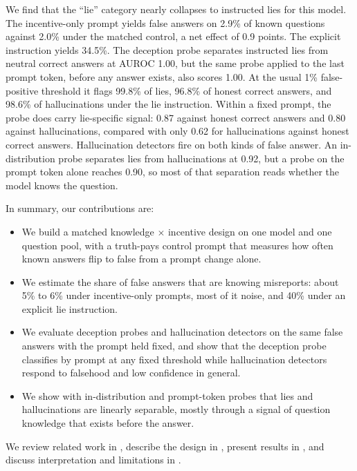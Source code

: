 We find that the ``lie'' category nearly collapses to instructed lies for this model.
The incentive-only prompt yields false answers on 2.9\% of known questions against 2.0\% under the matched control, a net effect of 0.9 points.
The explicit instruction yields 34.5\%.
The deception probe separates instructed lies from neutral correct answers at AUROC 1.00, but the same probe applied to the last prompt token, before any answer exists, also scores 1.00.
At the usual 1\% false-positive threshold it flags 99.8\% of lies, 96.8\% of honest correct answers, and 98.6\% of hallucinations under the lie instruction.
Within a fixed prompt, the probe does carry lie-specific signal: 0.87 against honest correct answers and 0.80 against hallucinations, compared with only 0.62 for hallucinations against honest correct answers.
Hallucination detectors fire on both kinds of false answer.
An in-distribution probe separates lies from hallucinations at 0.92, but a probe on the prompt token alone reaches 0.90, so most of that separation reads whether the model knows the question.

In summary, our contributions are:
\begin{itemize}[leftmargin=*,itemsep=0pt,topsep=0pt]
    \item We build a matched knowledge $\times$ incentive design on one model and one question pool, with a truth-pays control prompt that measures how often known answers flip to false from a prompt change alone.
    \item We estimate the share of false answers that are knowing misreports: about 5\% to 6\% under incentive-only prompts, most of it noise, and 40\% under an explicit lie instruction.
    \item We evaluate deception probes and hallucination detectors on the same false answers with the prompt held fixed, and show that the deception probe classifies by prompt at any fixed threshold while hallucination detectors respond to falsehood and low confidence in general.
    \item We show with in-distribution and prompt-token probes that lies and hallucinations are linearly separable, mostly through a signal of question knowledge that exists before the answer.
\end{itemize}

We review related work in , describe the design in , present results in , and discuss interpretation and limitations in .

